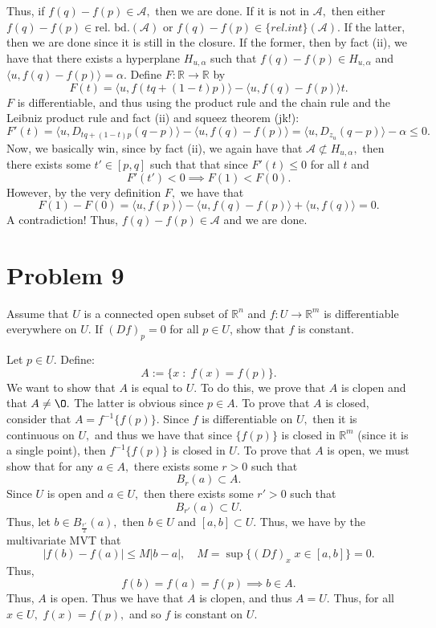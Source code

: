 \documentclass[11pt]{article}
\newcommand{\bbR}{\mathbb{R}}
\renewcommand{\emptyset}{\O}
\begin{document}
\begin{enumerate}
\begin{solution}
        Thus, if $f(q) - f(p) \in \mathscr{A},$ then  we are done. If it is not in $\mathscr{A},$ then either $f(q) - f(p) \in \text{rel. bd.}(\mathscr{A})$ or $f(q)  - f(p) \in \{rel. int\}(\mathscr{A}).$ If the latter, then we are done since it is still in the closure. If the former, then by fact (ii), we have that there exists a hyperplane $H_{u, \alpha}$ such that $f(q) - f(p) \in H_{u, \alpha}$ and $\langle u, f(q) - f(p)\rangle  = \alpha.$ Define $F: \bbR \to \bbR$ by 
        \[F(t) = \langle u, f(tq  + (1-t)p)\rangle - \langle u, f(q) - f(p) \rangle t.\] $F$ is differentiable, and thus using the product rule and the chain rule and the Leibniz product rule and fact (ii) and squeez theorem (jk!):
        \[F'(t) = \langle u, D_{tq + (1-t)p}(q-p)\rangle - \langle u, f(q) - f(p)\rangle = \langle u, D_{z_u}(q-p)\rangle - \alpha \leq 0.\]
        Now, we basically win, since by fact (ii), we again have that $\mathscr{A} \not \subset H_{u,\alpha},$ then there exists some $t' \in [p,q]$ such that that since $F'(t)\leq 0$ for all $t$ and 
        \[F'(t') < 0 \implies F(1) < F(0).\] However, by the very definition $F,$ we have that 
        \[F(1) - F(0) = \langle u, f(p)\rangle - \langle u, f(q) - f(p)\rangle + \langle u, f(q)\rangle = 0.\] A contradiction! Thus, $f(q) - f(p) \in \mathcal{A}$ and we are done.
    \end{solution}
    
\end{enumerate}

\newpage
\section*{Problem 9}
 \begin{problem}
     Assume that $U$ is a connected open subset of $\bbR^n$ and $f : U \to \bbR^m$ is differentiable everywhere on $U$. If $(Df)_p =0$ for all $p \in U$, show that $f$ is constant.
 \end{problem}
 \begin{solution}
    Let $p \in U.$ Define:
    \[A:= \{x\; : \; f(x) = f(p)\}.\] We want to show that $A$ is equal to $U.$ To do this, we prove that $A$ is clopen and that $A \neq \emptyset.$ The latter is obvious since $p \in A.$ To prove that $A$ is closed, consider that $A = f^{-1}\{f(p)\}.$ Since $f$ is differentiable on $U,$ then it is continuous on $U,$ and thus we have that since $\{f(p)\}$ is closed in $\bbR^m$ (since it is a single point), then $f^{-1}\{f(p)\}$ is closed in $U.$ To prove that $A$ is open, we must show that for any $a\in A,$ there exists some $r>0$ such that
    \[B_r(a)\subset A.\] Since $U$ is open and $a \in U,$ then there exists some $r'>0$ such that 
    \[B_{r'}(a)\subset U.\] Thus, let $b\in B_{\frac{r'}{2}}(a),$ then $b \in U$ and $[a,b]\subset U.$ Thus, we have by the multivariate MVT that 
    \[|f(b) - f(a)| \leq M |b-a|, \quad M = \sup\{(Df)_x \; x \in [a,b]\} = 0.\] Thus, 
    \[f(b) = f(a) = f(p) \implies b \in A.\] Thus, $A$ is open. Thus we have that $A$ is clopen, and thus $A = U.$ Thus, for all $x\in U,$ $f(x) = f(p),$ and so $f$ is constant on $U.$
 \end{solution}
\end{document}
